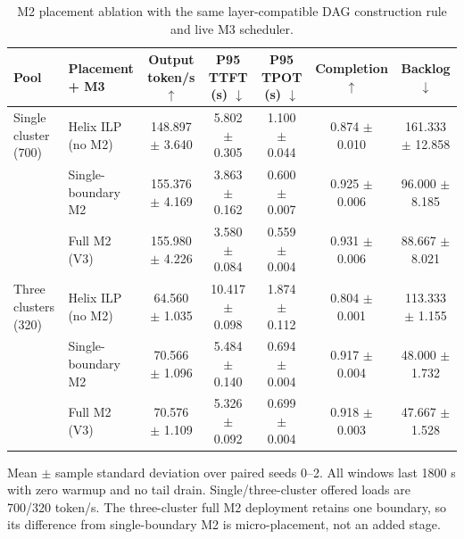 \begin{table}[t]
\caption{M2 placement ablation with the same layer-compatible DAG construction rule and live M3 scheduler.}
\label{tab:v3-m2-ablation}
\centering
\scriptsize
\setlength{\tabcolsep}{3pt}
\begin{tabular}{@{}llccccc@{}}
\toprule
Pool & Placement + M3 & Output token/s $\uparrow$ & P95 TTFT (s) $\downarrow$ & P95 TPOT (s) $\downarrow$ & Completion $\uparrow$ & Backlog $\downarrow$ \\
\midrule
Single cluster (700) & Helix ILP (no M2) & 148.897 $\pm$ 3.640 & 5.802 $\pm$ 0.305 & 1.100 $\pm$ 0.044 & 0.874 $\pm$ 0.010 & 161.333 $\pm$ 12.858 \\
 & Single-boundary M2 & 155.376 $\pm$ 4.169 & 3.863 $\pm$ 0.162 & 0.600 $\pm$ 0.007 & 0.925 $\pm$ 0.006 & 96.000 $\pm$ 8.185 \\
 & Full M2 (V3) & 155.980 $\pm$ 4.226 & 3.580 $\pm$ 0.084 & 0.559 $\pm$ 0.004 & 0.931 $\pm$ 0.006 & 88.667 $\pm$ 8.021 \\
\midrule
Three clusters (320) & Helix ILP (no M2) & 64.560 $\pm$ 1.035 & 10.417 $\pm$ 0.098 & 1.874 $\pm$ 0.112 & 0.804 $\pm$ 0.001 & 113.333 $\pm$ 1.155 \\
 & Single-boundary M2 & 70.566 $\pm$ 1.096 & 5.484 $\pm$ 0.140 & 0.694 $\pm$ 0.004 & 0.917 $\pm$ 0.004 & 48.000 $\pm$ 1.732 \\
 & Full M2 (V3) & 70.576 $\pm$ 1.109 & 5.326 $\pm$ 0.092 & 0.699 $\pm$ 0.004 & 0.918 $\pm$ 0.003 & 47.667 $\pm$ 1.528 \\
\bottomrule
\end{tabular}
\vspace{2pt}
\parbox{\textwidth}{\scriptsize Mean $\pm$ sample standard deviation over paired seeds 0--2. All windows last 1800 s with zero warmup and no tail drain. Single/three-cluster offered loads are 700/320 token/s. The three-cluster full M2 deployment retains one boundary, so its difference from single-boundary M2 is micro-placement, not an added stage.}
\end{table}
